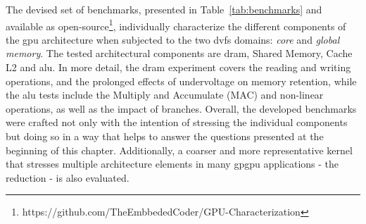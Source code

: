 The devised set of benchmarks,  presented in Table~\ref{tab:benchmarks} and available as open-source\footnote{https://github.com/TheEmbbededCoder/GPU-Characterization}, individually characterize the different components of the \acrshort{gpu} architecture when subjected to the two \acrshort{dvfs} domains: \textit{core} and \textit{global memory}. The tested architectural components are \acrshort{dram}, Shared Memory, Cache L2 and \acrshort{alu}. In more detail, the \acrshort{dram} experiment covers the reading and writing operations, and the prolonged effects of undervoltage on memory retention, while the \acrshort{alu} tests include the Multiply and Accumulate (MAC) and non-linear operations, as well as the impact of branches. Overall, the developed benchmarks were crafted not only with the intention of stressing the individual components but doing so in a way that helps to answer the questions presented at the beginning of this chapter. Additionally, a coarser and more representative kernel that stresses multiple architecture elements in many \acrshort{gpgpu} applications - the reduction - is also evaluated.


